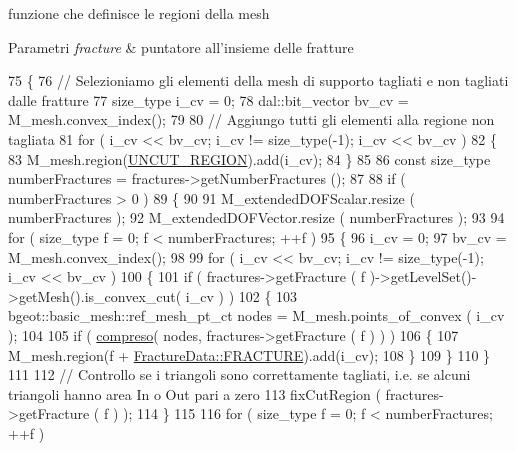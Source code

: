 funzione che definisce le regioni della mesh 


\begin{DoxyParams}{Parametri}
{\em fracture} & puntatore all'insieme delle fratture \\
\hline
\end{DoxyParams}

\begin{DoxyCode}
75 \{
76     \textcolor{comment}{// Selezioniamo gli elementi della mesh di supporto tagliati e non tagliati dalle fratture}
77     size\_type i\_cv = 0;
78     dal::bit\_vector bv\_cv = M\_mesh.convex\_index();
79 
80     \textcolor{comment}{// Aggiungo tutti gli elementi alla regione non tagliata}
81     \textcolor{keywordflow}{for} ( i\_cv << bv\_cv; i\_cv != size\_type(-1); i\_cv << bv\_cv )
82     \{
83         M\_mesh.region(\hyperlink{classMeshHandler_a239707613811024a58eece39a4c9bab3afc8bd5152d6d9b425b5e8bf4da8bd617}{UNCUT\_REGION}).add(i\_cv);
84     \}
85 
86     \textcolor{keyword}{const} size\_type numberFractures = fractures->getNumberFractures ();
87 
88     \textcolor{keywordflow}{if} ( numberFractures > 0 )
89     \{
90 
91         M\_extendedDOFScalar.resize ( numberFractures );
92         M\_extendedDOFVector.resize ( numberFractures );
93 
94         \textcolor{keywordflow}{for} ( size\_type f = 0; f < numberFractures; ++f )
95         \{
96             i\_cv = 0;
97             bv\_cv = M\_mesh.convex\_index();
98 
99             \textcolor{keywordflow}{for} ( i\_cv << bv\_cv; i\_cv != size\_type(-1); i\_cv << bv\_cv )
100             \{
101                 \textcolor{keywordflow}{if} ( fractures->getFracture ( f )->getLevelSet()->getMesh().is\_convex\_cut( i\_cv ) )
102                 \{
103                     bgeot::basic\_mesh::ref\_mesh\_pt\_ct nodes = M\_mesh.points\_of\_convex ( i\_cv );
104 
105                     \textcolor{keywordflow}{if} ( \hyperlink{classMeshHandler_a3c8a354d214222155cb4eecf8214c938}{compreso}( nodes, fractures->getFracture ( f ) ) )
106                     \{
107                                 M\_mesh.region(f + \hyperlink{classFractureData_aaeea1f30482432d159eda9d98beb5e89a351538e4c78b34b5c0416e21903e1812}{FractureData::FRACTURE}).add(i\_cv);
108                     \}
109                 \}
110             \}
111 
112             \textcolor{comment}{// Controllo se i triangoli sono correttamente tagliati, i.e. se alcuni triangoli hanno area In
       o Out pari a zero}
113             fixCutRegion ( fractures->getFracture ( f ) );
114         \}
115 
116         \textcolor{keywordflow}{for} ( size\_type f = 0; f < numberFractures; ++f )

\end{DoxyCode}
